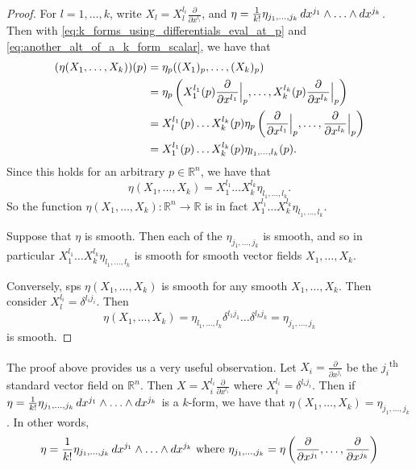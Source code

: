 \documentclass[notoc,notitlepage]{tufte-book}
\begin{document}
\begin{proof}
  For $l = 1, \ldots, k$, write $X_l = X_l^{l_i} \frac{\partial}{\partial x^{l_i}}$, and
  $\eta = \frac{1}{k!} \eta_{j_1, \ldots, j_k} \mathop{}\!d{x^{j_1}} \land \hdots \land \mathop{}\!d{x^{j_k}}$.
  Then with \cref{eq:k_forms_using_differentials_eval_at_p} and 
  \cref{eq:another_alt_of_a_k_form_scalar}, we have that
  \begin{align*}
    (\eta(X_1, \ldots, X_k))(p)
      &= \eta_p((X_1)_p, \ldots, (X_k)_p) \\
      &= \eta_p\left(X_1^{l_1}(p) \frac{\partial}{\partial x^{l_1}}\Big|_{p}^{}, \ldots, X_k^{l_k}(p) \frac{\partial}{\partial x^{l_k}}\Big|_{p}^{}\right) \\
      &= X_l^{l_1}(p) \hdots X_k^{l_k}(p) \eta_p 
      \left( \frac{\partial}{\partial x^{l_1}}\Big|_{p}^{}, \ldots, \frac{\partial}{\partial x^{l_k}}\Big|_{p}^{} \right) \\
      &= X_1^{l_1}(p) \hdots X_k^{l_k}(p) \eta_{l_1, \ldots, l_k}(p).
  \end{align*}
  Since this holds for an arbitrary $p \in \mathbb{R}^n$, we have that
  \begin{equation}\label{eq:k_forms_without_basis_eq1}
    \eta(X_1, \ldots, X_k) = X_1^{l_1} \hdots X_k^{l_k} \eta_{l_1, \ldots, l_k}.
  \end{equation}
  So the function $\eta(X_1, \ldots, X_k) : \mathbb{R}^n \to \mathbb{R}$ is in fact $X_1^{l_1}
  \hdots X_k^{l_k} \eta_{l_1, \ldots, l_k}$.

  Suppose that $\eta$ is smooth. Then each of the $\eta_{j_1, \ldots, j_k}$ is smooth, and so in
  particular $X_1^{l_1} \hdots X_k^{l_k} \eta_{l_1, \ldots, l_k}$ is smooth for smooth vector
  fields $X_1, \ldots, X_k$.

  Conversely, sps $\eta(X_1, \ldots, X_k)$ is smooth for any smooth $X_1, \ldots, X_k$. Then
  consider $X_l^{l_i} = \delta^{l_i j_i}$. Then
  \begin{equation*}
    \eta(X_1, \ldots, X_k) = \eta_{l_1, \ldots, l_k} \delta^{l_1 j_1} \hdots \delta^{l_k j_k} 
      = \eta_{j_1, \ldots, j_k}
  \end{equation*}
  is smooth.
\end{proof}

\begin{remark}
  The proof above provides us a very useful observation. Let 
  $X_i = \frac{\partial}{\partial x^{j_i}}$ be the $j_i$\textsuperscript{th} standard vector
  field on $\mathbb{R}^n$. Then $X = X_i^{l_i} \frac{\partial}{\partial x^{l_i}}$ where
  $X_i^{l_i} = \delta^{l_i j_i}$. Then if $\eta = \frac{1}{k!} \eta_{j_1, \ldots, j_k}
  \mathop{}\!d{x^{j_1}} \land \hdots \land \mathop{}\!d{x^{j_k}}$ is a $k$-form, we have that 
  $\eta(X_1, \ldots, X_k) = \eta_{j_1, \ldots, j_k}$. In other words,
  \begin{equation}\label{eq:k_forms_using_only_the_vector_fields}
    \eta = \frac{1}{k!} \eta_{j_1, \ldots, j_k} \mathop{}\!d{x^{j_1}} \land \hdots \land \mathop{}\!d{x^{j_k}}
    \text{ where } \eta_{j_1, \ldots, j_k} 
    = \eta \left( \frac{\partial}{\partial x^{j_1}}, \ldots, \frac{\partial}{\partial x^{j_k}} \right)
  \end{equation}
\end{remark}
\end{document}
